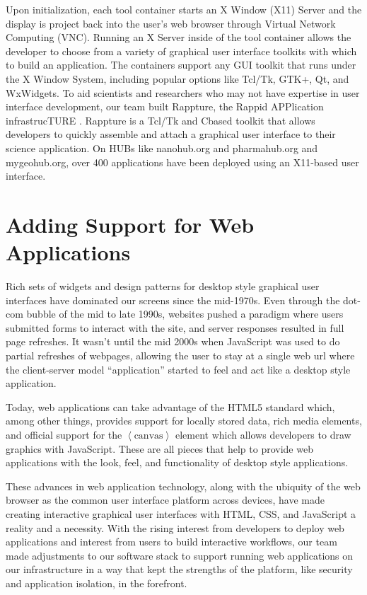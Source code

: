 \documentclass[conference]{../sty/IEEEtran}
\newcommand\CC{C\nolinebreak[4]\hspace{-.05em}\raisebox{.4ex}{\relsize{-3}{\textbf{++}}}\hspace{.25em}}
\begin{document}
Upon initialization, each tool container starts an X Window (X11) Server and the
display is project back into the user's web browser through Virtual Network
Computing (VNC).  Running an X Server inside of the tool container allows the
developer to choose from a variety of graphical user interface toolkits with
which to build an application. The containers support any GUI toolkit that runs
under the X Window System, including popular options like Tcl/Tk, GTK+, Qt, and
WxWidgets.  To aid scientists and researchers who may not have expertise in
user interface development, our team built Rappture, the Rappid APPlication
infrastrucTURE \cite{rappture}.  Rappture is a Tcl/Tk and \CC based toolkit
that allows developers to quickly assemble and attach a graphical user
interface to their science application. On HUBs like nanohub.org and
pharmahub.org and mygeohub.org, over 400 applications have been deployed using
an X11-based user interface.



\section {Adding Support for Web Applications}

Rich sets of widgets and design patterns for desktop style graphical user
interfaces have dominated our screens since the mid-1970s. Even through the
dot-com bubble of the mid to late 1990s, websites pushed a paradigm where users
submitted forms to interact with the site, and server responses resulted in full
page refreshes. It wasn't until the mid 2000s when JavaScript was used to do
partial refreshes of webpages, allowing the user to stay at a single web url
where the client-server model ``application'' started to feel and act like a
desktop style application.

Today, web applications can take advantage of the HTML5 standard which, among
other things, provides support for locally stored data, rich media elements,
and official support for the $\left\langle\text{canvas}\right\rangle$ element
which allows developers to draw graphics with JavaScript. These are all pieces
that help to provide web applications with the look, feel, and functionality of
desktop style applications.

These advances in web application technology, along with the ubiquity of the
web browser as the common user interface platform across devices, have made
creating interactive graphical user interfaces with HTML, CSS, and JavaScript a
reality and a necessity. With the rising interest from developers to deploy web
applications and interest from users to build interactive workflows, our team
made adjustments to our software stack to support running web applications on
our infrastructure in a way that kept the strengths of the platform, like
security and application isolation, in the forefront.
\end{document}
